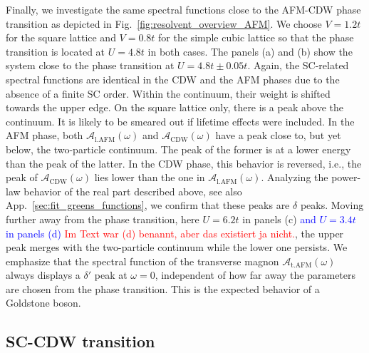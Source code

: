 \documentclass[
    reprint, 
    aps,
    preprintnumbers,
    twocolumn,
    prb,
    superscriptaddress
]{revtex4-2}
\newcommand{\spectral}[1]{\mathcal{A}_\text{#1}  (\omega)}
\newcommand{\red}[1]{\textcolor{red}{#1}}
\newcommand{\blue}[1]{\textcolor{blue}{#1}}
\begin{document}

Finally, we investigate the same spectral functions close to the AFM-CDW phase transition
as depicted in Fig.\ \ref{fig:resolvent_overview_AFM}.
We choose $V=1.2t$ for the square lattice and $V=0.8t$ for the simple cubic lattice so that
the phase transition is located at $U=4.8t$ in both cases. 
The panels (a) and (b) show the system close to the phase transition at $U=4.8t \pm 0.05t$.
Again, the SC-related spectral functions are identical in the CDW and the AFM phases
due to the absence of a finite SC order.
Within the continuum, their weight is shifted towards the upper edge.
On the square lattice only, there is a peak above the continuum.
It is likely to be smeared out if lifetime effects were included.
In the AFM phase, both $\spectral{l.AFM}$ and $\spectral{CDW}$ have a peak close to, but yet below, the two-particle continuum. 
The peak of the former is at a lower energy than the peak of the latter.
In the CDW phase, this behavior is reversed, i.e., the peak of $\spectral{CDW}$ lies lower
than the one in $\spectral{l.AFM}$.
Analyzing the power-law behavior of the real part described above, see also
App.\ \ref{sec:fit_greens_functions}, we confirm that these peaks are $\delta$ peaks.
Moving further away from the phase transition, here $U=6.2t$ in panels (c) \blue{and $U=3.4t$ in panels (d)}
\red{Im Text war (d) benannt, aber das existiert ja nicht.}, 
the upper peak merges with the two-particle continuum while the lower one persists.
We emphasize that the spectral function of the transverse magnon $\spectral{t.AFM}$ always 
displays a $\delta'$ peak at $\omega=0$, independent of how far away the parameters are chosen
from the phase transition. This is the expected behavior of a Goldstone boson.



\subsection{SC-CDW transition}
\end{document}
